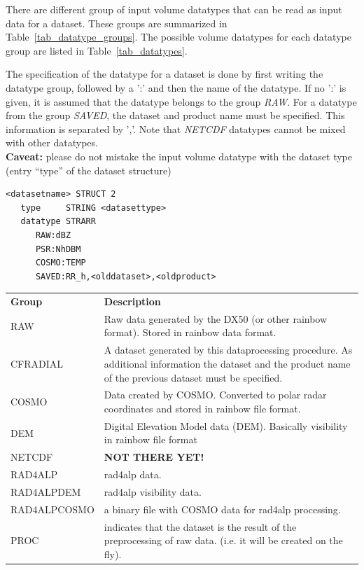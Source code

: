 \documentclass[a4paper,11pt,pdftex,twoside]{scrartcl}
\renewcommand{\bf}{\normalfont \bfseries}
\begin{document}
{{{There are different group of input volume datatypes that can be read as input data
for a dataset. These groups are summarized in Table~\ref{tab_datatype_groups}. The possible volume datatypes for each datatype group are listed in Table~\ref{tab_datatypes}.

The specification of the datatype for a dataset is done by first writing the datatype
group, followed by a ':' and then the name of the datatype. If no ':' is given, it is
assumed that the datatype belongs to the group \emph{RAW}.
For a datatype from the group \emph{SAVED}, the dataset and product name must be
specified. This information is separated by ','.
Note that \emph{NETCDF} datatypes cannot be mixed with other datatypes.\\

\noindent
{\bf Caveat:} please do not mistake the input volume datatype with the dataset type (entry  ``type'' of the dataset structure)
\begin{verbatim}
<datasetname> STRUCT 2
   type     STRING <datasettype>
   datatype STRARR
      RAW:dBZ
      PSR:NhDBM
      COSMO:TEMP
      SAVED:RR_h,<olddataset>,<oldproduct>
\end{verbatim}

\begin{table}[H]
\begin{tabularx}{\textwidth}{lX}
\bf{Group} & \bf{Description}\\
RAW       & Raw data generated by the DX50 (or other rainbow format). Stored in rainbow data format.\\
CFRADIAL     & A dataset generated by this dataprocessing procedure. As additional
            information the dataset and the product name of the previous dataset
            must be specified.\\
COSMO     & Data created by COSMO. Converted to polar radar coordinates and
            stored in rainbow file format.\\
DEM     & Digital Elevation Model data (DEM). Basically visibility in rainbow file format\\
NETCDF    & {\bf NOT THERE YET!} \\

RAD4ALP & rad4alp data.\\
RAD4ALPDEM & rad4alp visibility data.\\
RAD4ALPCOSMO & a binary file with COSMO data for rad4alp processing.\\
PROC & indicates that the dataset is the result of the preprocessing of raw data. (i.e. it will be created on the fly).\\


\end{tabularx}
\end{table}}}}
\end{document}
